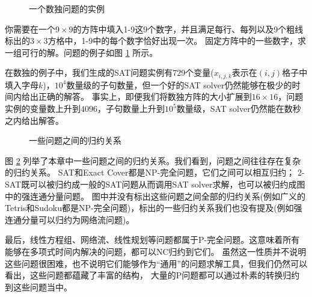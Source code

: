 \begin{figure}[h]
 \caption{一个数独问题的实例}
 \label{fig:sudoku}
\end{figure}

\begin{prob}
 你需要在一个$9\times9$的方阵中填入1-9这9个数字，并且满足每行、每列以及9个粗线标出的$3\times3$方格中，1-9中的每个数字恰好出现一次。
 固定方阵中的一些数字，求一组可行的解。问题的例子如图 \ref{fig:sudoku} 所示。
\end{prob}


在数独的例子中，我们生成的SAT问题实例有$729$个变量($x_{i,j,k}$表示在$(i,j)$格子中填入字母$k$)，$10^4$数量级的子句数量，但一个好的SAT solver仍然能够在极少的时间内给出正确的解答。
事实上，即便我们将数独方阵的大小扩展到$16\times16$，问题实例的变量数上升到$4096$，子句数量上升到$10^5$数量级，SAT solver仍然能在数秒之内给出解答。


\begin{figure}[h]
 \center
 \caption{一些问题之间的归约关系}
 \label{fig:sat-reduction}
\end{figure}

图 \ref{fig:sat-reduction} 列举了本章中一些问题之间的归约关系。我们看到，问题之间往往存在复杂的归约关系。
SAT和Exact Cover都是NP-完全问题，它们之间可以相互归约；
2-SAT既可以被归约成一般的SAT问题从而调用SAT solver求解，也可以被归约成图中的强连通分量问题。
图中并没有标出这些问题之间全部的归约关系(例如广义的Tetris和Sudoku都是NP-完全问题)，标出的一些归约关系我们也没有提及(例如强连通分量可以归约为网络流问题)。

最后，线性方程组、网络流、线性规划等问题都属于P-完全问题。这意味着所有能够在多项式时间内解决的问题，都可以NC归约到它们。
虽然这一性质并不说明这些问题很困难，也不说明它们能够作为``通用''的问题求解工具，但我们仍然可以看出，这些问题都蕴藏了丰富的结构，
大量的P问题都可以通过朴素的转换归约到这些问题当中。
